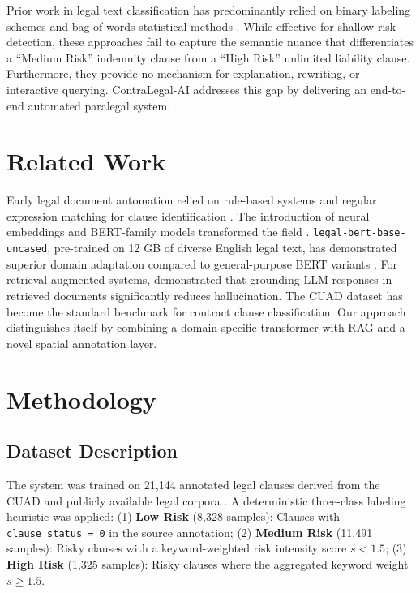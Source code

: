 \documentclass[conference]{IEEEtran}
\begin{document}
Prior work in legal text classification has predominantly relied on binary labeling schemes and bag-of-words statistical methods \cite{contract_review_old}. While effective for shallow risk detection, these approaches fail to capture the semantic nuance that differentiates a ``Medium Risk'' indemnity clause from a ``High Risk'' unlimited liability clause. Furthermore, they provide no mechanism for explanation, rewriting, or interactive querying. ContraLegal-AI addresses this gap by delivering an end-to-end automated paralegal system.

\section{Related Work}
Early legal document automation relied on rule-based systems and regular expression matching for clause identification \cite{contract_review_old}. The introduction of neural embeddings and BERT-family models transformed the field \cite{attention_is_all_you_need}. \texttt{legal-bert-base-uncased}, pre-trained on 12 GB of diverse English legal text, has demonstrated superior domain adaptation compared to general-purpose BERT variants \cite{legalbert}. For retrieval-augmented systems, \citet{rag_lewis} demonstrated that grounding LLM responses in retrieved documents significantly reduces hallucination. The CUAD dataset \cite{atticus} has become the standard benchmark for contract clause classification. Our approach distinguishes itself by combining a domain-specific transformer with RAG and a novel spatial annotation layer.

\section{Methodology}

\subsection{Dataset Description}
The system was trained on 21,144 annotated legal clauses derived from the CUAD and publicly available legal corpora \cite{atticus}. A deterministic three-class labeling heuristic was applied: (1) \textbf{Low Risk} (8,328 samples): Clauses with \texttt{clause\_status = 0} in the source annotation; (2) \textbf{Medium Risk} (11,491 samples): Risky clauses with a keyword-weighted risk intensity score $s < 1.5$; (3) \textbf{High Risk} (1,325 samples): Risky clauses where the aggregated keyword weight $s \geq 1.5$.
\end{document}

